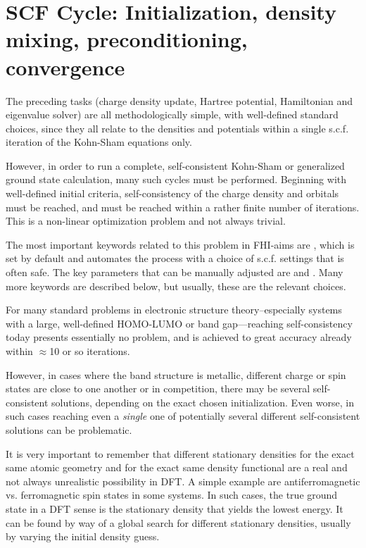 \section{SCF Cycle: Initialization, density mixing, preconditioning, convergence}
\label{Sec:scf}

The preceding tasks (charge density update, Hartree potential,
Hamiltonian and eigenvalue solver) are all methodologically simple,
with well-defined standard choices, since they all relate to the
densities and potentials within a single s.c.f. iteration of the
Kohn-Sham equations only.

However, in order to run a complete, self-consistent Kohn-Sham or
generalized ground state calculation, many such cycles must be
performed. Beginning with well-defined initial criteria,
self-consistency of the charge density and orbitals must be reached,
and must be reached within a rather finite number of iterations. This
is a non-linear optimization problem and not always trivial.

The most important keywords related to this problem in FHI-aims are
, which is set by default and automates the
process with a choice of s.c.f. settings that is often safe. The key
parameters that can be manually adjusted are
 and . Many more
keywords are described below, but usually, these are the relevant
choices.

For many standard problems in electronic structure theory--especially
systems with a large, well-defined HOMO-LUMO or band gap---reaching
self-consistency today presents essentially no problem, and is
achieved to great accuracy already within $\approx$10 or so
iterations.

However, in cases where the band structure is metallic, different
charge or spin states are close to one another or in competition,
there may be several self-consistent solutions, depending on the
exact chosen initialization. Even worse, in such cases reaching even a
\emph{single} one of potentially several different self-consistent
solutions can be problematic.

It is very important to remember that different stationary densities
for the exact same atomic geometry and for the exact same density
functional are a real and not always unrealistic possibility in DFT.
A simple example are
antiferromagnetic vs. ferromagnetic spin states in some systems. In
such cases, the true ground state in a DFT sense is the stationary density
that yields the lowest energy. It can be found by way of a global search for
different stationary densities, usually by varying the initial density guess.

